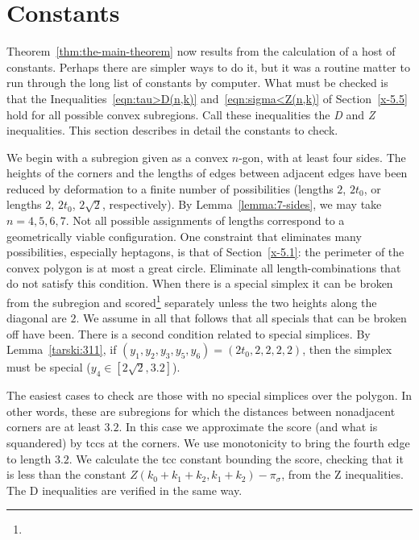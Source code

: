 \section{Constants} %

Theorem~\ref{thm:the-main-theorem} now results from the calculation of a
host of constants. Perhaps there are simpler ways to do it, but it was a
routine matter to run through the long list of constants by computer.
What must be checked is that the Inequalities~\ref{eqn:tau>D(n,k)}
and~\ref{eqn:sigma<Z(n,k)} of Section~\ref{x-5.5} hold for all possible
convex subregions. Call these inequalities the {\it D} and {\it Z}
inequalities.  This section describes in detail the constants to check.

We begin with a subregion given as a convex $n$-gon, with at least
four sides.   The heights of the corners and the lengths of edges
between adjacent edges have been reduced by deformation to a finite
number of possibilities (lengths $2$, $2t_0$, or lengths $2$,
$2t_0$, $2\sqrt{2}$, respectively). By Lemma~\ref{lemma:7-sides}, we
may take $n=4,5,6,7$. Not all possible assignments of lengths
correspond to a geometrically viable configuration. One constraint
that eliminates many possibilities, especially heptagons, is that of
Section~\ref{x-5.1}: the perimeter of the convex polygon is at most
a great circle.  Eliminate all length-combinations that do not
satisfy this condition.  When there is a special simplex it can be
broken
from the subregion and scored\footnote{} %
separately unless the two heights along the diagonal are $2$.
We assume in all that follows that all specials that can be
broken off have been. There is a second condition related to special
simplices.  By Lemma~\ref{tarski:311}, if
$(y_1,y_2,y_3,y_5,y_6)= (2t_0,2,2,2,2)$, then
the simplex must be special
($y_4\in[2\sqrt{2},3.2]$).


The easiest cases to check are those with no special simplices over the
polygon.  In other words, these are subregions for which the distances
between nonadjacent corners are at least $3.2$.  In this case we
approximate the score (and what is squandered) by tccs at the corners.
We use monotonicity to bring the fourth edge to length $3.2$. We
calculate the tcc constant bounding the score, checking that it is less
than the constant
    $ Z(k_0+k_1+k_2,k_1+k_2) - \pi_\sigma$,
from the Z inequalities. The D inequalities  are verified in the same
way.


